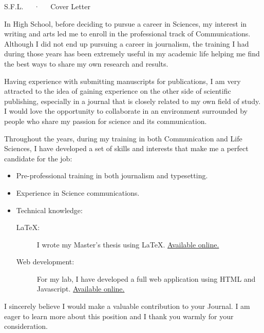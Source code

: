 \documentclass[11pt, letterpaper]{awesome-cv2}
\begin{document}
\makecvheader[R]

\makecvfooter{\today} {} {S.F.L.~~~·~~~Cover Letter}

\makelettertitle

\begin{cvletter}

In High School, before deciding to pursue a career in Sciences, my interest in
writing and arts led me to enroll in the professional track of Communications.
Although I did not end up pursuing a career in journalism, the training I had
during those years has been extremely useful in my academic life helping me find
the best ways to share my own research and results.

Having experience with submitting manuscripts for publications, I am very
attracted to the idea of gaining experience on the other side of scientific
publishing, especially in a journal that is closely related to my own field of
study. I would love the opportunity to collaborate in an environment
surrounded by people who share my passion for science and its communication.

Throughout the years, during my training in both Communication and Life Sciences,
I have developed a set of skills and interests that make me a perfect candidate
for the job:
\begin{itemize}
  \item Pre-professional training in both journalism and typesetting.
  \item Experience in Science communications.
  \item Technical knowledge:
    \begin{description}
    \item[\LaTeX:] I wrote my Master's thesis using \LaTeX.
      \href{https://github.com/soffiafdz/TesisINB}{Available online.}
    \item[Web development:] For my lab, I have developed a full web
      application using HTML and Javascript.
      \href{https://github.com/soffiafdz/Qrater}{Available online.}
    \end{description}
\end{itemize}
I sincerely believe I would make a valuable contribution to your Journal. I am
eager to learn more about this position and I thank you warmly for your
consideration.

\end{cvletter}


\makeletterclosing
\end{document}
